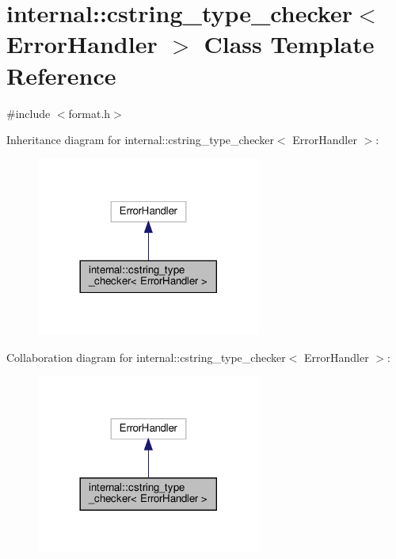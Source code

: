 \hypertarget{classinternal_1_1cstring__type__checker}{}\section{internal\+:\+:cstring\+\_\+type\+\_\+checker$<$ Error\+Handler $>$ Class Template Reference}
\label{classinternal_1_1cstring__type__checker}


{\ttfamily \#include $<$format.\+h$>$}



Inheritance diagram for internal\+:\+:cstring\+\_\+type\+\_\+checker$<$ Error\+Handler $>$\+:
\nopagebreak
\begin{figure}[H]
\begin{center}
\leavevmode
\includegraphics[width=209pt]{classinternal_1_1cstring__type__checker__inherit__graph}
\end{center}
\end{figure}


Collaboration diagram for internal\+:\+:cstring\+\_\+type\+\_\+checker$<$ Error\+Handler $>$\+:
\nopagebreak
\begin{figure}[H]
\begin{center}
\leavevmode
\includegraphics[width=209pt]{classinternal_1_1cstring__type__checker__coll__graph}
\end{center}
\end{figure}
